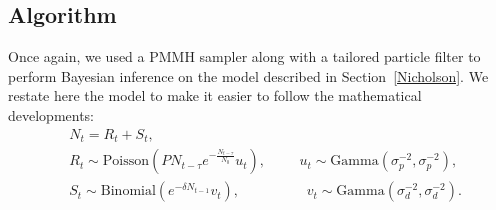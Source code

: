 \documentclass[12pt]{article}
\begin{document}
	\subsection{Algorithm}
		Once again, we used a PMMH sampler along with a tailored particle filter to perform Bayesian inference on the model described in Section~\ref{Nicholson}. We restate here the model to make it easier to follow the mathematical developments:
		\begin{align*}
		& N_t = R_t + S_t, \\
		& R_t \sim  \mathrm{Poisson}(PN_{t-\tau}e^{-\frac{N_{t-\tau}}{N_0}}u_t),  \hspace{1cm} u_t \sim \mathrm{Gamma}(\sigma_p^{-2}, \sigma_p^{-2}),\\ 
		& S_t \sim \mathrm{Binomial}(e^{-\delta N_{t-1}}v_t), \hspace{2cm}  v_t \sim \mathrm{Gamma}(\sigma_d^{-2}, \sigma_d^{-2}).
		\end{align*}
\end{document}
